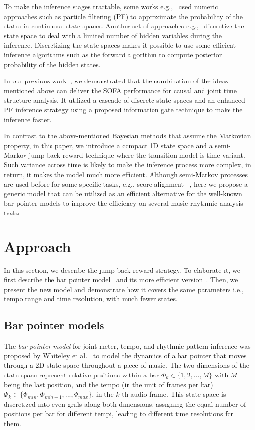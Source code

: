 \documentclass{article}
\begin{document}
To make the inference stages tractable, some works e.g.,~\cite{duan:1,Srinivasamurthy:1,Hainsworth:1,Cemgil:1,Holzapfel:2} used numeric approaches such as particle filtering (PF) to approximate the probability of the states in continuous state spaces. Another set of approaches e.g.,~\cite{whiteley:1,Krebs:1,Peeters:1,krebs:2,Holzapfel:1} discretize the state space to deal with a limited number of hidden variables during the inference. Discretizing the state spaces makes it possible to use some efficient inference algorithms
such as the forward algorithm to compute 
posterior probability of the hidden states. 

In our previous work~\cite{Heydari:2}, we demonstrated that the combination of the ideas mentioned above can deliver the SOFA performance for causal and joint time structure analysis. It utilized a cascade of discrete state spaces and an enhanced PF inference strategy using a proposed information gate technique to make the inference faster. 

In contrast to the above-mentioned Bayesian methods that assume the Markovian property, in this paper, we introduce a compact 1D state space and a semi-Markov jump-back reward technique where the transition model is time-variant. Such variance across time is likely to make the inference process more complex, in return, it makes the model much more efficient. Although semi-Markov processes are used before for some specific tasks, e.g., score-alignment ~\cite{cont}, here we propose a generic model that can be utilized as an efficient alternative for the well-known bar pointer models to improve the efficiency on several music rhythmic analysis tasks. 




\section{Approach}
\label{sec:approach}

In this section, we describe the jump-back reward strategy. To elaborate it, we first describe the bar pointer model~\cite{whiteley:1} and its more efficient version~\cite{Krebs:1}. Then, we present the new model and demonstrate how it covers the same parameters i.e., tempo range and time resolution, with much fewer states.

\subsection{Bar pointer models}
\label{ssec:bar pointer model}
The \textit{bar pointer model} for joint meter, tempo, and rhythmic pattern inference 
was proposed by Whiteley et al.~\cite{whiteley:1} to model the dynamics of a bar pointer that moves through a 2D state space throughout a piece of music. The two dimensions of the state space represent relative positions within a bar $\Phi_{k}\in\{1,2,...,M\}$ with $M$ being the last position, and the tempo (in the unit of frames per bar) $\dot\Phi_{k}\in\{ \dot\Phi_{min},\dot\Phi_{min+1},...,\dot\Phi_{max}\}$, in the $k$-th audio frame. This state space is discretized into even grids along both dimensions, assigning the equal number of positions per bar for different tempi, leading to different time resolutions for them.
\end{document}
